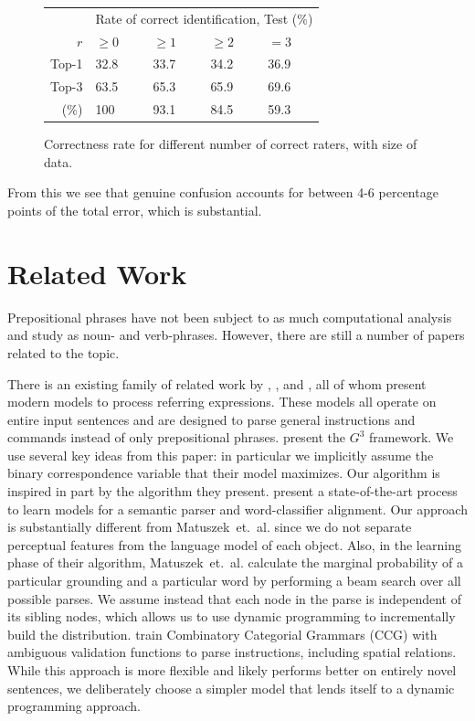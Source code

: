\documentclass[conference]{IEEEtran}
\numberwithin{equation}{section}
\begin{document}
\begin{figure}[h!tb]
  \centering
  \begin{tabular}{|r|m{1.2cm}m{1.2cm}m{1.2cm}m{1.2cm}|}\hline
  & \multicolumn{4}{c|}{Rate of correct identification, Test (\%)} \\
  $r$ & $\geq 0$ & $\geq 1$ & $\geq 2$ & $=3$ \\\hline
  Top-1 & 32.8 & 33.7 & 34.2 & 36.9 \\
  Top-3 & 63.5 & 65.3 & 65.9 & 69.6 \\\hline
  (\%) & 100 & 93.1 & 84.5 & 59.3 \\\hline
  \end{tabular}
  \caption{Correctness rate for different number of correct raters, with size of data.}
  \label{fig:interrater}
\end{figure}

From this we see that genuine confusion accounts for between 4-6 percentage points of the total error, which is substantial.

\section{Related Work}

Prepositional phrases have not been subject to as much computational analysis and study as noun- and verb-phrases. However, there are still a number of papers related to the topic. 

There is an existing family of related work by \citet{tellex2011understanding}, \citet{UW_RSE_ICML2012}, and \citet{artzi2013weakly}, all of whom present modern models to process referring expressions. These models all operate on entire input sentences and are designed to parse general instructions and commands instead of only prepositional phrases. 
\citet{tellex2011understanding} present the $G^3$ framework. We use several key ideas from this paper: in particular we implicitly assume the binary correspondence variable that their model maximizes. Our algorithm is inspired in part by the algorithm they present.
\citet{UW_RSE_ICML2012} present a state-of-the-art process to learn models for a semantic parser and word-classifier alignment. Our approach is substantially different from Matuszek~et.~al. since we do not separate perceptual features from the language model of each object. Also, in the learning phase of their algorithm, Matuszek~et.~al. calculate the marginal probability of a particular grounding and a particular word by performing a beam search over all possible parses. We assume instead that each node in the parse is independent of its sibling nodes, which allows us to use dynamic programming to incrementally build the distribution.
\citet{artzi2013weakly} train Combinatory Categorial Grammars (CCG) with ambiguous validation functions to parse instructions, including spatial relations. While this approach is more flexible and likely performs better on entirely novel sentences, we deliberately choose a simpler model that lends itself to a dynamic programming approach.
\end{document}
